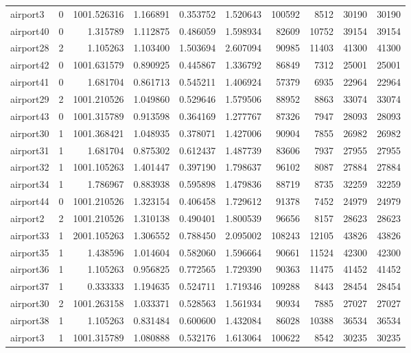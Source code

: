 \begin{longtable}{|l|r|r|r|r|r|r|r|r|r|}
airport3 & 0 & 1001.526316 & 1.166891 & 0.353752 & 1.520643 & 100592 & 8512 & 30190 & 30190 \\
airport40 & 0 & 1.315789 & 1.112875 & 0.486059 & 1.598934 & 82609 & 10752 & 39154 & 39154 \\
airport28 & 2 & 1.105263 & 1.103400 & 1.503694 & 2.607094 & 90985 & 11403 & 41300 & 41300 \\
airport42 & 0 & 1001.631579 & 0.890925 & 0.445867 & 1.336792 & 86849 & 7312 & 25001 & 25001 \\
airport41 & 0 & 1.681704 & 0.861713 & 0.545211 & 1.406924 & 57379 & 6935 & 22964 & 22964 \\
airport29 & 2 & 1001.210526 & 1.049860 & 0.529646 & 1.579506 & 88952 & 8863 & 33074 & 33074 \\
airport43 & 0 & 1001.315789 & 0.913598 & 0.364169 & 1.277767 & 87326 & 7947 & 28093 & 28093 \\
airport30 & 1 & 1001.368421 & 1.048935 & 0.378071 & 1.427006 & 90904 & 7855 & 26982 & 26982 \\
airport31 & 1 & 1.681704 & 0.875302 & 0.612437 & 1.487739 & 83606 & 7937 & 27955 & 27955 \\
airport32 & 1 & 1001.105263 & 1.401447 & 0.397190 & 1.798637 & 96102 & 8087 & 27884 & 27884 \\
airport34 & 1 & 1.786967 & 0.883938 & 0.595898 & 1.479836 & 88719 & 8735 & 32259 & 32259 \\
airport44 & 0 & 1001.210526 & 1.323154 & 0.406458 & 1.729612 & 91378 & 7452 & 24979 & 24979 \\
airport2 & 2 & 1001.210526 & 1.310138 & 0.490401 & 1.800539 & 96656 & 8157 & 28623 & 28623 \\
airport33 & 1 & 2001.105263 & 1.306552 & 0.788450 & 2.095002 & 108243 & 12105 & 43826 & 43826 \\
airport35 & 1 & 1.438596 & 1.014604 & 0.582060 & 1.596664 & 90661 & 11524 & 42300 & 42300 \\
airport36 & 1 & 1.105263 & 0.956825 & 0.772565 & 1.729390 & 90363 & 11475 & 41452 & 41452 \\
airport37 & 1 & 0.333333 & 1.194635 & 0.524711 & 1.719346 & 109288 & 8443 & 28454 & 28454 \\
airport30 & 2 & 1001.263158 & 1.033371 & 0.528563 & 1.561934 & 90934 & 7885 & 27027 & 27027 \\
airport38 & 1 & 1.105263 & 0.831484 & 0.600600 & 1.432084 & 86028 & 10388 & 36534 & 36534 \\
airport3 & 1 & 1001.315789 & 1.080888 & 0.532176 & 1.613064 & 100622 & 8542 & 30235 & 30235 \\

\end{longtable}
